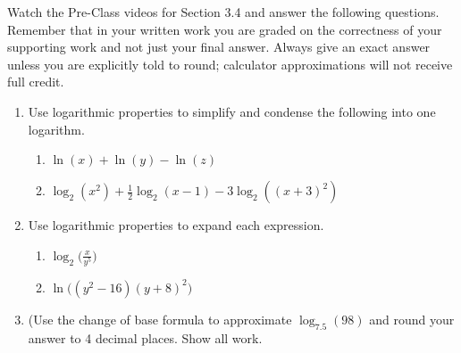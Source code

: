 


\noindent Watch the Pre-Class videos for Section 3.4 and answer the following questions. Remember that in your written work you are graded on the correctness of your supporting work and not just your final answer. Always give an exact answer unless you are explicitly told to round; calculator approximations will not receive full credit. 


\begin{enumerate}
\item Use logarithmic properties to simplify and condense the following into one logarithm.
\begin{enumerate}
\item $\ln(x)+\ln(y)-\ln(z)$
\vfill
\item $\displaystyle \log_2(x^2)+\frac{1}{2}\log_2(x-1)-3\log_2((x+3)^2)$
\vfill

\end{enumerate}


\item Use logarithmic properties to expand each expression.  
\begin{enumerate}
\item $\displaystyle \log_2\Big(\frac{x}{y^5}\Big)$
\vfill
\item $\displaystyle \ln \Big((y^2-16)(y+8)^2  \Big)$
\vfill

\end{enumerate}

\item (Use the change of base formula to approximate $\log_{7.5}(98)$ and round your answer to 4 decimal places.  Show all work.
\vfill







\end{enumerate}



